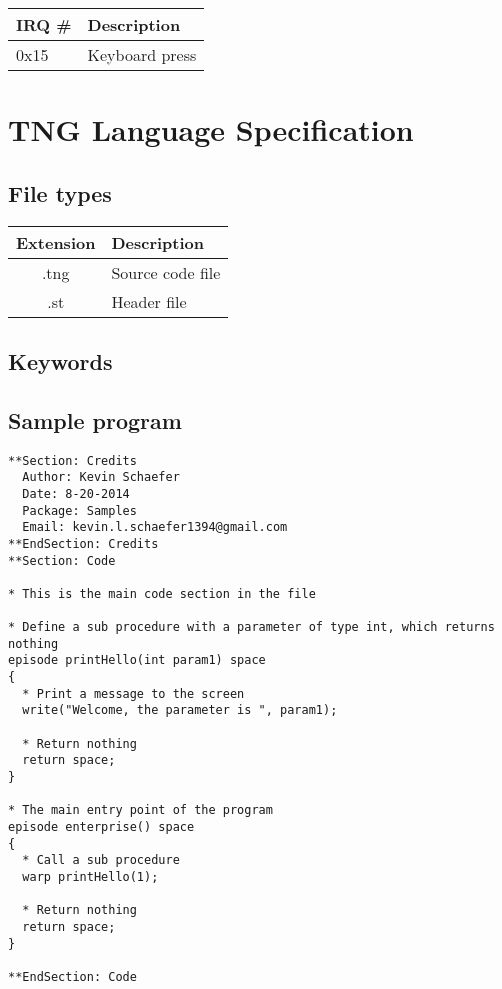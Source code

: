 \documentclass{book}
\begin{document}
\begin{tabular}{|l|l|}
  \hline
  \textbf{IRQ \#} & \textbf{Description} \\
  \hline
  0x15 & Keyboard press \\
  \hline
\end{tabular}


\chapter{TNG Language Specification}
\section{File types}
\begin{tabular}{|c|l|}
  \hline
  \textbf{Extension} & \textbf{Description} \\
  \hline
  .tng & Source code file \\
  .st  & Header file \\
  \hline
\end{tabular}

\section{Keywords}

\section{Sample program}
\begin{lstlisting}
**Section: Credits
  Author: Kevin Schaefer
  Date: 8-20-2014
  Package: Samples
  Email: kevin.l.schaefer1394@gmail.com
**EndSection: Credits
**Section: Code

* This is the main code section in the file

* Define a sub procedure with a parameter of type int, which returns nothing
episode printHello(int param1) space
{
  * Print a message to the screen
  write("Welcome, the parameter is ", param1);

  * Return nothing
  return space;
}

* The main entry point of the program
episode enterprise() space
{
  * Call a sub procedure
  warp printHello(1);

  * Return nothing
  return space;
}

**EndSection: Code
\end{lstlisting}
\end{document}
